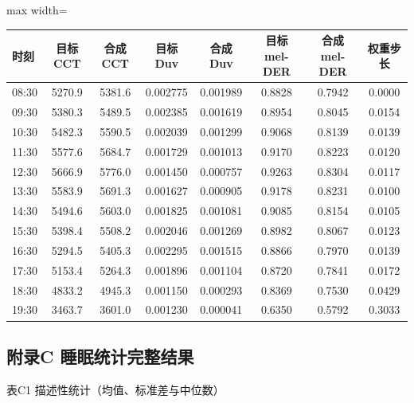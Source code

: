 \documentclass[UTF8,a4paper,12pt]{ctexart}
\begin{document}
\begin{table}[H]
\centering
\small
\begin{adjustbox}{max width=\textwidth}
\begin{tabular}{lccccccc}
\toprule
时刻 & 目标CCT & 合成CCT & 目标Duv & 合成Duv & 目标mel-DER & 合成mel-DER & 权重步长 \\
\midrule
08:30 & 5270.9 & 5381.6 & 0.002775 & 0.001989 & 0.8828 & 0.7942 & 0.0000 \\
09:30 & 5380.3 & 5489.5 & 0.002385 & 0.001619 & 0.8954 & 0.8045 & 0.0154 \\
10:30 & 5482.3 & 5590.5 & 0.002039 & 0.001299 & 0.9068 & 0.8139 & 0.0139 \\
11:30 & 5577.6 & 5684.7 & 0.001729 & 0.001013 & 0.9170 & 0.8223 & 0.0120 \\
12:30 & 5666.9 & 5776.0 & 0.001450 & 0.000757 & 0.9263 & 0.8304 & 0.0117 \\
13:30 & 5583.9 & 5691.3 & 0.001627 & 0.000905 & 0.9178 & 0.8231 & 0.0100 \\
14:30 & 5494.6 & 5603.0 & 0.001825 & 0.001081 & 0.9085 & 0.8154 & 0.0105 \\
15:30 & 5398.4 & 5508.2 & 0.002046 & 0.001269 & 0.8982 & 0.8067 & 0.0123 \\
16:30 & 5294.5 & 5405.3 & 0.002295 & 0.001515 & 0.8866 & 0.7970 & 0.0139 \\
17:30 & 5153.4 & 5264.3 & 0.001896 & 0.001104 & 0.8720 & 0.7841 & 0.0172 \\
18:30 & 4833.2 & 4945.3 & 0.001150 & 0.000293 & 0.8369 & 0.7530 & 0.0429 \\
19:30 & 3463.7 & 3601.0 & 0.001230 & 0.000041 & 0.6350 & 0.5792 & 0.3033 \\
\bottomrule
\end{tabular}
\end{adjustbox}
\end{table}

\subsection{附录C  睡眠统计完整结果}

表C1  描述性统计（均值、标准差与中位数）
\end{document}
